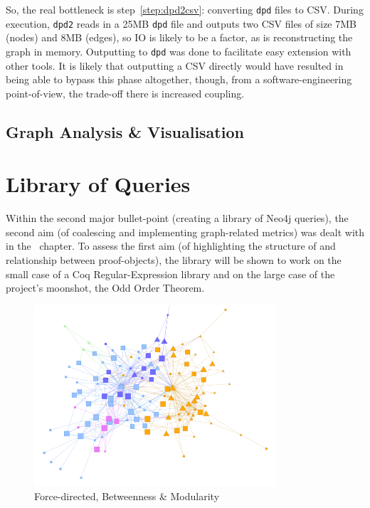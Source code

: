 So, the real bottleneck is step~\ref{step:dpd2csv}: converting \texttt{dpd}
files to CSV. During execution, \texttt{dpd2} reads in a 25MB \texttt{dpd} file
and outputs two CSV files of size 7MB (nodes) and 8MB (edges), so IO is likely
to be a factor, as is reconstructing the graph in memory. Outputting to
\texttt{dpd} was done to facilitate easy extension with other tools. It is
likely that outputting a CSV directly would have resulted in being able to
bypass this phase altogether, though, from a software-engineering
point-of-view, the trade-off there is increased coupling.

\subsection{Graph Analysis \& Visualisation}


\section{Library of Queries}\label{sec:libeval}

Within the second major bullet-point (creating a library of Neo4j queries), the
second aim (of coalescing and implementing graph-related metrics) was dealt
with in the~ chapter. To assess the first aim (of
highlighting the structure of and relationship between proof-objects), the
library will be shown to work on the small case of a Coq Regular-Expression
library and on the large case of the project's moonshot, the
Odd Order Theorem.

\begin{figure}[p]
\centering
\includegraphics[width=0.8\textwidth]{img/regexp/direct.png}
\caption{Force-directed, Betweenness \& Modularity}\label{fig:regexp:prmod}
\end{figure}

